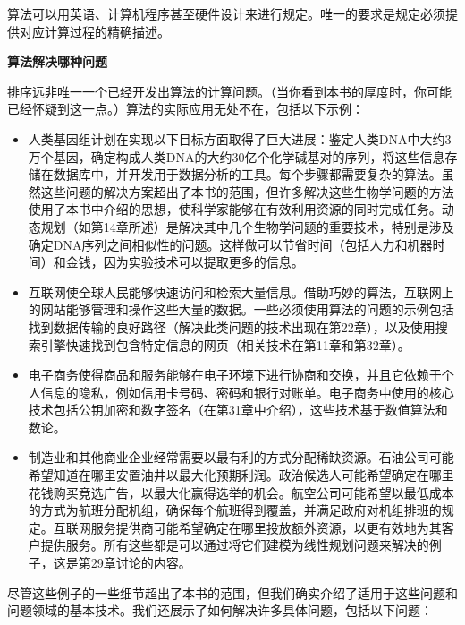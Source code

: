 \documentclass[lang=cn,newtx,10pt,scheme=chinese]{elegantbook}
\begin{document}
算法可以用英语、计算机程序甚至硬件设计来进行规定。唯一的要求是规定必须提供对应计算过程的精确描述。

\textbf{算法解决哪种问题}

排序远非唯一一个已经开发出算法的计算问题。（当你看到本书的厚度时，你可能已经怀疑到这一点。）算法的实际应用无处不在，包括以下示例：

\begin{itemize}
    \item 人类基因组计划在实现以下目标方面取得了巨大进展：鉴定人类DNA中大约3万个基因，确定构成人类DNA的大约30亿个化学碱基对的序列，将这些信息存储在数据库中，并开发用于数据分析的工具。每个步骤都需要复杂的算法。虽然这些问题的解决方案超出了本书的范围，但许多解决这些生物学问题的方法使用了本书中介绍的思想，使科学家能够在有效利用资源的同时完成任务。动态规划（如第14章所述）是解决其中几个生物学问题的重要技术，特别是涉及确定DNA序列之间相似性的问题。这样做可以节省时间（包括人力和机器时间）和金钱，因为实验技术可以提取更多的信息。
    \item 互联网使全球人民能够快速访问和检索大量信息。借助巧妙的算法，互联网上的网站能够管理和操作这些大量的数据。一些必须使用算法的问题的示例包括找到数据传输的良好路径（解决此类问题的技术出现在第22章），以及使用搜索引擎快速找到包含特定信息的网页（相关技术在第11章和第32章）。
    \item 电子商务使得商品和服务能够在电子环境下进行协商和交换，并且它依赖于个人信息的隐私，例如信用卡号码、密码和银行对账单。电子商务中使用的核心技术包括公钥加密和数字签名（在第31章中介绍），这些技术基于数值算法和数论。
    \item 制造业和其他商业企业经常需要以最有利的方式分配稀缺资源。石油公司可能希望知道在哪里安置油井以最大化预期利润。政治候选人可能希望确定在哪里花钱购买竞选广告，以最大化赢得选举的机会。航空公司可能希望以最低成本的方式为航班分配机组，确保每个航班得到覆盖，并满足政府对机组排班的规定。互联网服务提供商可能希望确定在哪里投放额外资源，以更有效地为其客户提供服务。所有这些都是可以通过将它们建模为线性规划问题来解决的例子，这是第29章讨论的内容。
\end{itemize}

尽管这些例子的一些细节超出了本书的范围，但我们确实介绍了适用于这些问题和问题领域的基本技术。我们还展示了如何解决许多具体问题，包括以下问题：
\end{document}
